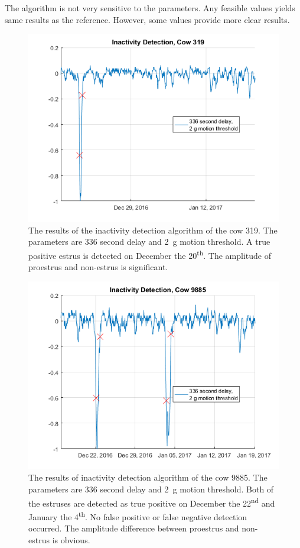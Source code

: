 \documentclass[english,12pt,a4paper,pdftex,elec,utf8]{aaltothesis}
\begin{document}
The algorithm is not very sensitive to the parameters. Any feasible values yields same results as the reference. However, some values provide more clear results.



\begin{figure}[htb]
\centering
\includegraphics[width = 0.75 \textwidth]{figures/InactivityDetectionCow319.png}
\caption{The results of the inactivity detection algorithm of the cow 319. The parameters are 336 second delay and \SI{2}{\gram} motion threshold. A true positive estrus is detected on December the 20\textsuperscript{th}. The amplitude of proestrus and non-estrus is significant. }
\label{InactivityDetectionCow319}
\end{figure}


\begin{figure}[htb]
\centering
\includegraphics[width = 0.75 \textwidth]{figures/InactivityDetectionCow9885.png}
\caption{The results of inactivity detection algorithm of the cow 9885. The parameters are 336 second delay and \SI{2}{\gram} motion threshold. Both of the estruses are detected as true positive on December the 22\textsuperscript{nd} and January the 4\textsuperscript{th}. No false positive or false negative detection occurred. The amplitude difference between proestrus and non-estrus is obvious.}
\label{InactivityDetectionCow9885}
\end{figure}
\end{document}
